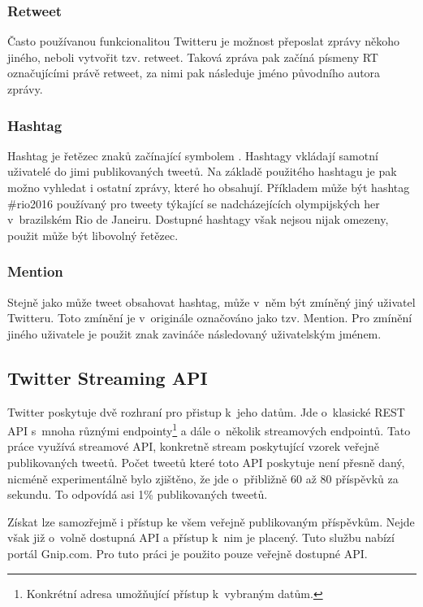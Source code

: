 \documentclass[thesis=B,czech]{FITthesis}[2012/06/26]
\begin{document}
\subsubsection{Retweet}

	Často používanou funkcionalitou Twitteru je možnost přeposlat zprávy někoho jiného, neboli vytvořit tzv. retweet. Taková zpráva pak začíná písmeny RT označujícími právě retweet, za nimi pak následuje jméno původního autora zprávy. 


\subsubsection{Hashtag}

	Hashtag je řetězec znaků začínající symbolem \uv{\#}. Hashtagy vkládají samotní uživatelé do jimi publikovaných tweetů. Na základě použitého hashtagu je pak možno vyhledat i ostatní zprávy, které ho obsahují. Příkladem může být hashtag \#rio2016 používaný pro tweety týkající se nadcházejících olympijských her v~brazilském Rio de Janeiru. Dostupné hashtagy však nejsou nijak omezeny, použit může být libovolný řetězec. 


\subsubsection{Mention}

	Stejně jako může tweet obsahovat hashtag, může v~něm být zmíněný jiný uživatel Twitteru. Toto zmínění je v~originále označováno jako tzv. Mention. Pro zmínění jiného uživatele je použit znak zavináče následovaný uživatelským jménem. 


\subsection{Twitter Streaming API}
\label{twitter-api}
	Twitter poskytuje dvě rozhraní pro přistup k~jeho datům. Jde o~klasické REST API s~mnoha různými endpointy\footnote{Konkrétní adresa umožňující přístup k~vybraným datům.} a dále o~několik streamových endpointů. Tato práce využívá streamové API, konkretně stream poskytující vzorek veřejně publikovaných tweetů\cite{twitter-api}. Počet tweetů které toto API poskytuje není přesně daný, nicméně experimentálně bylo zjištěno, že jde o~přibližně 60 až 80 příspěvků za sekundu. To odpovídá asi 1\% publikovaných tweetů. 
	
	Získat lze samozřejmě i přístup ke všem veřejně publikovaným příspěvkům. Nejde však již o~volně dostupná API a přístup k~nim je placený. Tuto službu nabízí portál Gnip.com\cite{gnip}. Pro tuto práci je použito pouze veřejně dostupné API. 
	
\end{document}
